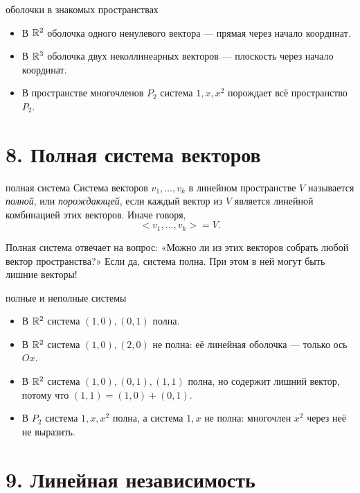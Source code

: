 \begin{examplebox}{оболочки в знакомых пространствах}
\begin{itemize}
    \item В $\mathbb{R}^2$ оболочка одного ненулевого вектора --- прямая через начало координат.
    \item В $\mathbb{R}^3$ оболочка двух неколлинеарных векторов --- плоскость через начало координат.
    \item В пространстве многочленов $P_2$ система $1,x,x^2$ порождает всё пространство $P_2$.
\end{itemize}
\end{examplebox}

\section*{8. Полная система векторов}

\begin{defbox}{полная система}
Система векторов $v_1,\ldots,v_k$ в линейном пространстве $V$ называется \emph{полной}, или \emph{порождающей}, если каждый вектор из $V$ является линейной комбинацией этих векторов. Иначе говоря,
\[
    <v_1,\ldots,v_k>=V.
\]
\end{defbox}

\begin{remarkbox}
Полная система отвечает на вопрос: «Можно ли из этих векторов собрать любой вектор пространства?» Если да, система полна. При этом в ней могут быть лишние векторы!
\end{remarkbox}

\begin{examplebox}{полные и неполные системы}
\begin{itemize}
    \item В $\mathbb{R}^2$ система $(1,0),(0,1)$ полна.
    \item В $\mathbb{R}^2$ система $(1,0),(2,0)$ не полна: её линейная оболочка --- только ось $Ox$.
    \item В $\mathbb{R}^2$ система $(1,0),(0,1),(1,1)$ полна, но содержит лишний вектор, потому что $(1,1)=(1,0)+(0,1)$.
    \item В $P_2$ система $1,x,x^2$ полна, а система $1,x$ не полна: многочлен $x^2$ через неё не выразить.
\end{itemize}
\end{examplebox}

\newpage

\section*{9. Линейная независимость}

